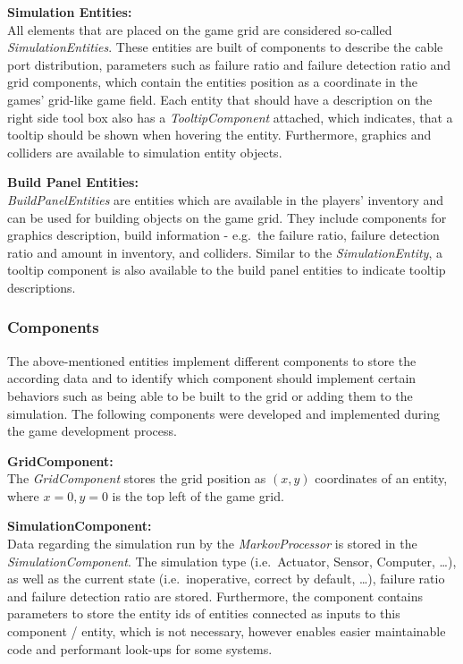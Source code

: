 \textbf{Simulation Entities:} \\
All elements that are placed on the game grid are considered so-called \textit{SimulationEntities}.
These entities are built of components to describe the cable port distribution, parameters such as failure ratio and failure detection ratio and grid components, which contain the
entities position as a coordinate in the games' grid-like game field.
Each entity that should have a description on the right side tool box also has a \textit{TooltipComponent} attached, which indicates, that
a tooltip should be shown when hovering the entity.
Furthermore, graphics and colliders are available to simulation entity objects.

\textbf{Build Panel Entities:} \\
\textit{BuildPanelEntities} are entities which are available in the players' inventory and can be used for building objects on the game grid.
They include components for graphics description, build information - e.g.\ the failure ratio, failure detection ratio and amount in inventory,
and colliders.
Similar to the \textit{SimulationEntity}, a tooltip component is also available to the build panel entities to indicate tooltip descriptions.
\subsubsection{Components}\label{subsubsec:components2}
The above-mentioned entities implement different components to store the according data and to identify which component
should implement certain behaviors such as being able to be built to the grid or adding them to the simulation.
The following components were developed and implemented during the game development process.

\textbf{GridComponent:} \\
The \textit{GridComponent} stores the grid position as $(x,y)$ coordinates of an entity, where $x=0, y=0$ is the top left of the game grid.

\textbf{SimulationComponent:} \\
Data regarding the simulation run by the \textit{MarkovProcessor} is stored in the \textit{SimulationComponent}.
The simulation type (i.e.\ Actuator, Sensor, Computer, \ldots), as well as the current state (i.e.\ inoperative, correct by default, \ldots), failure
ratio and failure detection ratio are stored.
Furthermore, the component contains parameters to store the entity ids of entities connected as inputs to this component / entity, which is
not necessary, however enables easier maintainable code and performant look-ups for some systems.

